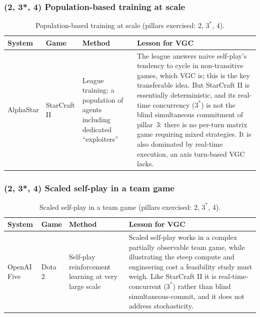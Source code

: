 \subsubsection{(2, 3*, 4) Population-based training at scale}
\label{subsubsec:analog_alphastar}

\begin{table}[H]
\small
\tablespacing
\begin{tabularx}{\textwidth}{@{}>{\hsize=0.55\hsize\raggedright\arraybackslash}X
                                >{\hsize=0.55\hsize\raggedright\arraybackslash}X
                                >{\hsize=1.10\hsize\raggedright\arraybackslash}X
                                >{\hsize=1.80\hsize\raggedright\arraybackslash}X@{}}
\toprule
\textbf{System} & \textbf{Game} & \textbf{Method} & \textbf{Lesson for VGC} \\
\midrule
AlphaStar \cite{vinyals2019alphastar}
  & StarCraft II
  & League training: a population of agents including dedicated ``exploiters''
  & The league answers naive self-play's tendency to cycle in non-transitive
    games, which VGC is; this is the key transferable idea. But StarCraft II is
    essentially deterministic, and its real-time concurrency ($3^{*}$) is not the
    blind simultaneous commitment of pillar~3: there is no per-turn matrix game
    requiring mixed strategies. It is also dominated by real-time execution, an
    axis turn-based VGC lacks. \\
\bottomrule
\end{tabularx}
\caption{Population-based training at scale (pillars exercised: 2, $3^{*}$, 4).}
\label{tab:analog_alphastar}
\end{table}

\subsubsection{(2, 3*, 4) Scaled self-play in a team game}
\label{subsubsec:analog_openaifive}

\begin{table}[H]
\small
\tablespacing
\begin{tabularx}{\textwidth}{@{}>{\hsize=0.55\hsize\raggedright\arraybackslash}X
                                >{\hsize=0.55\hsize\raggedright\arraybackslash}X
                                >{\hsize=1.10\hsize\raggedright\arraybackslash}X
                                >{\hsize=1.80\hsize\raggedright\arraybackslash}X@{}}
\toprule
\textbf{System} & \textbf{Game} & \textbf{Method} & \textbf{Lesson for VGC} \\
\midrule
OpenAI Five \cite{berner2019openaifive}
  & Dota 2
  & Self-play reinforcement learning at very large scale
  & Scaled self-play works in a complex partially observable team game, while
    illustrating the steep compute and engineering cost a feasibility study must
    weigh. Like StarCraft II it is real-time-concurrent ($3^{*}$) rather than
    blind simultaneous-commit, and it does not address stochasticity. \\
\bottomrule
\end{tabularx}
\caption{Scaled self-play in a team game (pillars exercised: 2, $3^{*}$, 4).}
\label{tab:analog_openaifive}
\end{table}

